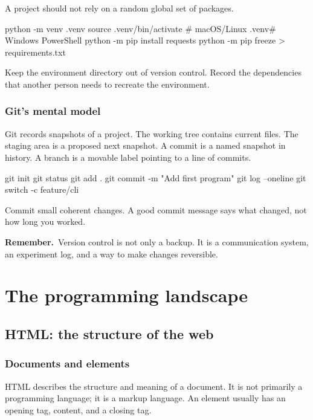 \documentclass[11pt,openany,oneside]{book}
\newcommand{\remember}{\textsf{\bfseries\color{teal}Remember.}\ }
\begin{document}
A project should not rely on a random global set of packages.

\begin{code}[language=bash]
python -m venv .venv
source .venv/bin/activate       # macOS/Linux
.venv\Scripts\activate          # Windows PowerShell
python -m pip install requests
python -m pip freeze > requirements.txt
\end{code}

Keep the environment directory out of version control. Record the dependencies that another person needs to recreate the environment.

\section{Git's mental model}

Git records snapshots of a project. The working tree contains current files. The staging area is a proposed next snapshot. A commit is a named snapshot in history. A branch is a movable label pointing to a line of commits.

\begin{code}[language=bash]
git init
git status
git add .
git commit -m "Add first program"
git log --oneline
git switch -c feature/cli
\end{code}

Commit small coherent changes. A good commit message says what changed, not how long you worked.

\begin{keybox}
\remember Version control is not only a backup. It is a communication system, an experiment log, and a way to make changes reversible.
\end{keybox}

\part{The programming landscape}

\chapter{HTML: the structure of the web}

\section{Documents and elements}

HTML describes the structure and meaning of a document. It is not primarily a programming language; it is a markup language. An element usually has an opening tag, content, and a closing tag.
\end{document}
